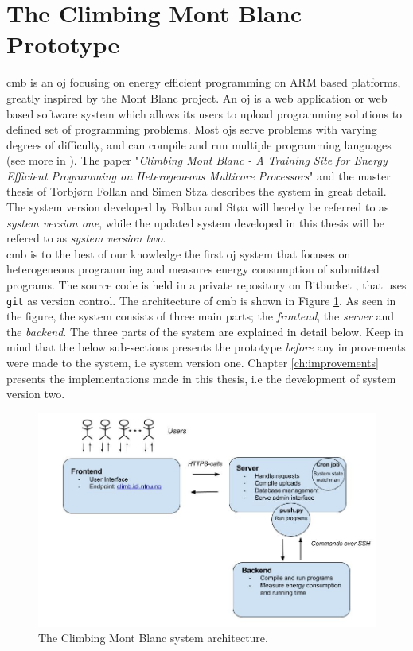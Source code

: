 \section{The Climbing Mont Blanc Prototype}
\label{sec:cmb}
\gls{cmb} is an \gls{oj} focusing on energy efficient programming on ARM based platforms, greatly inspired by the Mont Blanc project. An \gls{oj} is a web application or web based software system which allows its users to upload programming solutions to defined set of programming problems. Most \glspl{oj} serve problems with varying degrees of difficulty, and can compile and run multiple programming languages (see more in ). The paper "\textit{Climbing Mont Blanc - A Training Site for Energy Efficient Programming on Heterogeneous Multicore Processors}" \cite{a:CMB} and the master thesis of Torbjørn Follan and Simen Støa \cite{mt:T&S} describes the system in great detail. The system version developed by Follan and Støa will hereby be referred to as \textit{system version one}, while the updated system developed in this thesis will be refered to as \textit{system version two}. \\

\gls{cmb} is to the best of our knowledge the first \gls{oj} system that focuses on heterogeneous programming and measures energy consumption of submitted programs. The source code is held in a private repository on Bitbucket \cite{BITBUCKET}, that uses \texttt{git} \cite{GIT} as version control. The architecture of \gls{cmb} is shown in Figure \ref{fig:cmb_arch}. As seen in the figure, the system consists of three main parts; the \textit{frontend}, the \textit{server} and the \textit{backend}. The three parts of the system are explained in detail below. Keep in mind that the below sub-sections presents the prototype \textit{before} any improvements were made to the system, i.e system version one. Chapter \ref{ch:improvements} presents the implementations made in this thesis, i.e the development of system version two.

\begin{figure}
  \includegraphics[width=1.0\textwidth]{figs/cmb_arch.jpg}
  \caption[The Climbing Mont Blanc system architecture.]{The Climbing Mont Blanc system architecture.}
  \label{fig:cmb_arch}
\end{figure}

